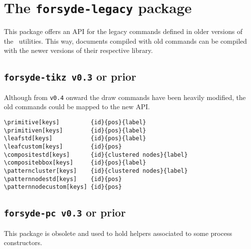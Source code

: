 \section{The \texttt{forsyde-legacy} package}
\label{sec:legacy-package}

This package offers an API for the legacy commands defined in older versions of the \ForSyDeLaTeX\  utilities. This way, documents compiled with old commands can be compiled with the newer versions of their respective library.

\subsection{\texttt{forsyde-tikz v0.3} or prior}
\label{sec:forsyde-tikz-v0.3}

Although from \texttt{v0.4} onward the draw commands have been heavily modified, the old commands could be mapped to the new API.

\begin{lstlisting}
\primitive[keys]         {id}{pos}{label}
\primitiven[keys]        {id}{pos}{label}
\leafstd[keys]           {id}{pos}{label}
\leafcustom[keys]        {id}{pos}
\compositestd[keys]      {id}{clustered nodes}{label}
\compositebbox[keys]     {id}{pos}{label}
\patterncluster[keys]    {id}{clustered nodes}{label}
\patternnodestd[keys]    {id}{pos}
\patternnodecustom[keys] {id}{pos}
\end{lstlisting}

\subsection{\texttt{forsyde-pc v0.3} or prior}
\label{sec:forsyde-pc-v0.3}

This package is obsolete and used to hold helpers associated to some \ForSyDe process constructors.


